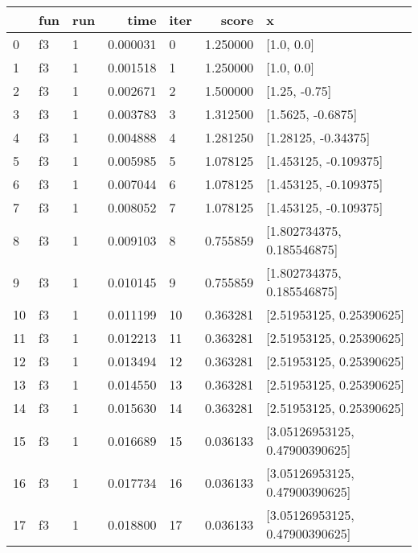 \begin{tabular}{lllrlrl}
\toprule
{} & fun & run &      time & iter &     score &                                          x \\
\midrule
0   &  f3 &   1 &  0.000031 &    0 &  1.250000 &                                 [1.0, 0.0] \\
1   &  f3 &   1 &  0.001518 &    1 &  1.250000 &                                 [1.0, 0.0] \\
2   &  f3 &   1 &  0.002671 &    2 &  1.500000 &                              [1.25, -0.75] \\
3   &  f3 &   1 &  0.003783 &    3 &  1.312500 &                          [1.5625, -0.6875] \\
4   &  f3 &   1 &  0.004888 &    4 &  1.281250 &                        [1.28125, -0.34375] \\
5   &  f3 &   1 &  0.005985 &    5 &  1.078125 &                      [1.453125, -0.109375] \\
6   &  f3 &   1 &  0.007044 &    6 &  1.078125 &                      [1.453125, -0.109375] \\
7   &  f3 &   1 &  0.008052 &    7 &  1.078125 &                      [1.453125, -0.109375] \\
8   &  f3 &   1 &  0.009103 &    8 &  0.755859 &                 [1.802734375, 0.185546875] \\
9   &  f3 &   1 &  0.010145 &    9 &  0.755859 &                 [1.802734375, 0.185546875] \\
10  &  f3 &   1 &  0.011199 &   10 &  0.363281 &                   [2.51953125, 0.25390625] \\
11  &  f3 &   1 &  0.012213 &   11 &  0.363281 &                   [2.51953125, 0.25390625] \\
12  &  f3 &   1 &  0.013494 &   12 &  0.363281 &                   [2.51953125, 0.25390625] \\
13  &  f3 &   1 &  0.014550 &   13 &  0.363281 &                   [2.51953125, 0.25390625] \\
14  &  f3 &   1 &  0.015630 &   14 &  0.363281 &                   [2.51953125, 0.25390625] \\
15  &  f3 &   1 &  0.016689 &   15 &  0.036133 &             [3.05126953125, 0.47900390625] \\
16  &  f3 &   1 &  0.017734 &   16 &  0.036133 &             [3.05126953125, 0.47900390625] \\
17  &  f3 &   1 &  0.018800 &   17 &  0.036133 &             [3.05126953125, 0.47900390625] \\

\end{tabular}
